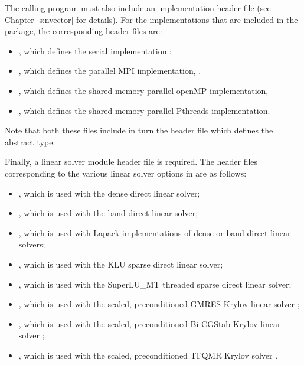The calling program must also include an {\nvector} implementation header file
(see Chapter \ref{s:nvector} for details).
For the {\nvector} implementations that are included in the {\ida} package,
the corresponding header files are:
\begin{itemize}
\item {}, 
  which defines the serial implementation {\nvecs};
\item {}, 
  which defines the parallel MPI implementation, {\nvecp}.
\item {},
  which defines the shared memory parallel openMP implementation,
\item {},
  which defines the shared memory parallel Pthreads implementation.
\end{itemize}
Note that both these files include in turn the header file  which 
defines the abstract  type. 

Finally, a linear solver module header file is required. 
The header files corresponding to the various linear solver options in {\ida} are
as follows:
\begin{itemize}
\item {}, 
  which is used with the dense direct linear solver;

\item {}, 
  which is used with the band direct linear solver;

\item {},
  which is used with Lapack implementations of dense or band direct linear solvers;
  
\item {},
  which is used with the KLU sparse direct linear solver;
  
\item {},
  which is used with the SuperLU\_MT threaded sparse direct linear solver;
  
\item {}, 
  which is used with the scaled, preconditioned GMRES Krylov linear solver {\spgmr};

\item {}, 
  which is used with the scaled, preconditioned Bi-CGStab Krylov linear solver {\spbcg};

\item {}, 
  which is used with the scaled, preconditioned TFQMR Krylov solver {\sptfqmr}.
\end{itemize}

